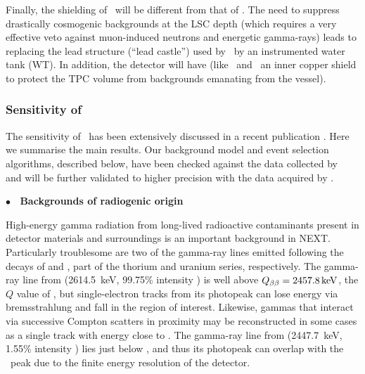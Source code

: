 
\indent

Finally, the shielding of \NHD\ will be different from that of \Next. The need to suppress drastically cosmogenic backgrounds at the LSC depth (which requires a very effective veto against muon-induced neutrons and energetic gamma-rays) leads to replacing the lead structure (``lead castle'') used by \Next\ by an instrumented water tank (WT). In addition, the detector will have (like \NEW\ and \Next\ an inner copper shield to protect the TPC volume from backgrounds emanating from the vessel). 


\subsubsection{Sensitivity of \NHD}
\label{sec:BackgroundsAtTheTonneScale}

The sensitivity of \NHD\ has been extensively discussed in a recent publication \cite{NEXT:2020amj}. Here we summarise the main results. 
Our background model and event selection algorithms, described below, have been checked against the data collected by \NEW\ \cite{Novella:2019cne} and will be further validated to higher precision with the data acquired  by \Next. 

\indent

{\bf $\bullet$~ Backgrounds of radiogenic origin}

\indent
High-energy gamma radiation from long-lived radioactive contaminants present in detector materials and surroundings is an important background in NEXT. Particularly troublesome are two of the gamma-ray lines emitted following the decays of  and , part of the thorium and uranium series, respectively. The gamma-ray line from  (2614.5~keV, 99.75\% intensity \cite{nudat}) is well above $\Qbb=\SI{2457.8}{\kilo\eV}$, the $Q$ value of , but single-electron tracks from its photopeak can lose energy via bremsstrahlung and fall in the region of interest. Likewise, gammas that interact via successive Compton scatters in proximity may be reconstructed in some cases as a single track with energy close to \Qbb. The gamma-ray line from  (2447.7~keV, 1.55\% intensity \cite{nudat}) lies just below \Qbb, and thus its photopeak can overlap with the \bbonu\ peak due to the finite energy resolution of the detector.

